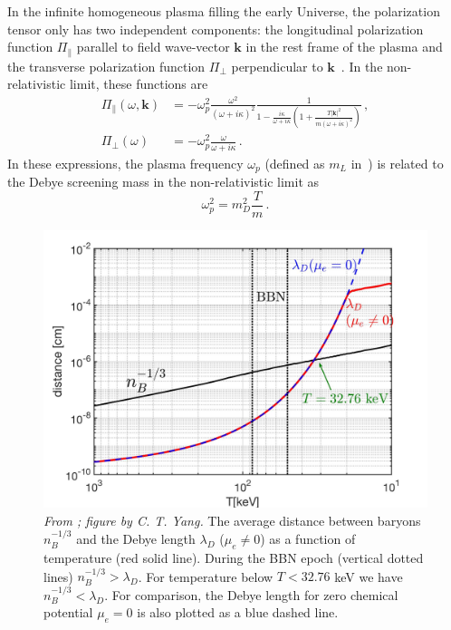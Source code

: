 In the infinite homogeneous plasma filling the early Universe, the polarization tensor only has two independent components: the longitudinal polarization function $\Pi_{\parallel}$ parallel to field wave-vector $\boldsymbol{k}$ in the rest frame of the plasma and the transverse polarization function $\Pi_{\perp}$ perpendicular to $\boldsymbol{k}$~\cite{melrose2008quantum}. In the non-relativistic limit, these functions are~\cite{Formanek:2021blc}
\begin{align}\label{eq:polfuncs}
	\Pi_\parallel(\omega,\boldsymbol{k}) &= -\omega_p^2\frac{\omega^2}{(\omega+ i \kappa)^2} \frac{1}{1-\frac{i\kappa}{\omega+ i \kappa}\left(1+\frac{ T |\boldsymbol{k}|^2}{m (\omega+ i \kappa)^2} \right)}\,,\\
	\Pi_{\perp}(\omega) &= -\omega_p^2 \frac{\omega}{\omega+ i \kappa}\,.
\end{align}
In these expressions, the plasma frequency $\omega_p$ (defined as $m_L$ in~\cite{Formanek:2021blc}) is related to the Debye screening mass in the non-relativistic limit as
\begin{equation}\label{eq:plasmafreq}
 \omega_p^2 = m_D^2\frac{T}{m}\,.
\end{equation}

\begin{figure}[ht]
\begin{center}
\includegraphics[width=0.95\linewidth]{plots/chap03BBN/Distance_Plasma002.jpg}
\caption{\textit{From \cite{Grayson:2023flr}; figure by C. T. Yang.} The average distance between baryons $n_B^{-1/3}$ and the Debye length $\lambda_D$ ($\mu_e \neq 0$) as a function of temperature (red solid line). During the BBN epoch (vertical dotted lines) $n_B^{-1/3}>\lambda_D$. For temperature below $T<32.76$ keV we have $n_B^{-1/3}<\lambda_D$. For comparison, the Debye length for zero chemical potential $\mu_e=0$ is also plotted as a blue dashed line.}
\label{MeanFreePath_fig}
\end{center}
\end{figure}

